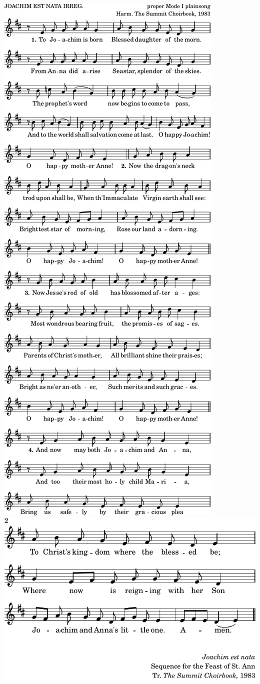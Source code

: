 \includegraphics{To Joachim is born (JOACHIM EST NATA)-Melody-1}%
\ifx\betweenLilyPondSystem \undefined
  \linebreak
\else
  \expandafter{}%
\fi
\includegraphics{To Joachim is born (JOACHIM EST NATA)-Melody-2}%
